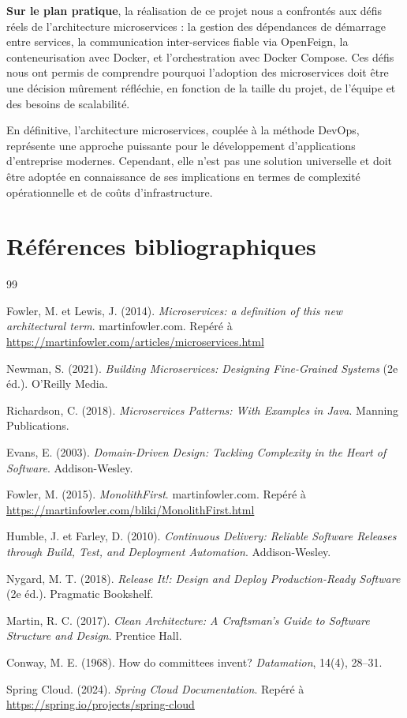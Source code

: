 \documentclass[12pt,a4paper]{article}
\begin{document}
\textbf{Sur le plan pratique}, la réalisation de ce projet nous a confrontés aux défis réels de l'architecture microservices : la gestion des dépendances de démarrage entre services, la communication inter-services fiable via OpenFeign, la conteneurisation avec Docker, et l'orchestration avec Docker Compose. Ces défis nous ont permis de comprendre pourquoi l'adoption des microservices doit être une décision mûrement réfléchie, en fonction de la taille du projet, de l'équipe et des besoins de scalabilité.

En définitive, l'architecture microservices, couplée à la méthode DevOps, représente une approche puissante pour le développement d'applications d'entreprise modernes. Cependant, elle n'est pas une solution universelle et doit être adoptée en connaissance de ses implications en termes de complexité opérationnelle et de coûts d'infrastructure.

\newpage
\section{Références bibliographiques}

\begin{thebibliography}{99}

Fowler, M. et Lewis, J. (2014). \textit{Microservices: a definition of this new architectural term}. martinfowler.com. Repéré à \url{https://martinfowler.com/articles/microservices.html}

Newman, S. (2021). \textit{Building Microservices: Designing Fine-Grained Systems} (2e éd.). O'Reilly Media.

Richardson, C. (2018). \textit{Microservices Patterns: With Examples in Java}. Manning Publications.

Evans, E. (2003). \textit{Domain-Driven Design: Tackling Complexity in the Heart of Software}. Addison-Wesley.

Fowler, M. (2015). \textit{MonolithFirst}. martinfowler.com. Repéré à \url{https://martinfowler.com/bliki/MonolithFirst.html}

Humble, J. et Farley, D. (2010). \textit{Continuous Delivery: Reliable Software Releases through Build, Test, and Deployment Automation}. Addison-Wesley.

Nygard, M. T. (2018). \textit{Release It!: Design and Deploy Production-Ready Software} (2e éd.). Pragmatic Bookshelf.

Martin, R. C. (2017). \textit{Clean Architecture: A Craftsman's Guide to Software Structure and Design}. Prentice Hall.

Conway, M. E. (1968). How do committees invent? \textit{Datamation}, 14(4), 28--31.

Spring Cloud. (2024). \textit{Spring Cloud Documentation}. Repéré à \url{https://spring.io/projects/spring-cloud}

\end{thebibliography}
\end{document}
